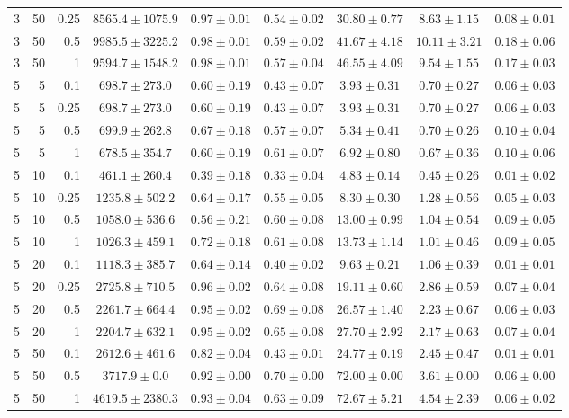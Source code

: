 \begin{table}[htbp]
\begin{tabular}{@{}rrrcccccc@{}}
3 & 50 & 0.25 & $8565.4 \pm 1075.9$ & $0.97 \pm 0.01$ & $0.54 \pm 0.02$ & $30.80 \pm 0.77$ & $8.63 \pm 1.15$ & $0.08 \pm 0.01$ \\
3 & 50 & 0.5 & $9985.5 \pm 3225.2$ & $0.98 \pm 0.01$ & $0.59 \pm 0.02$ & $41.67 \pm 4.18$ & $10.11 \pm 3.21$ & $0.18 \pm 0.06$ \\
3 & 50 & 1 & $9594.7 \pm 1548.2$ & $0.98 \pm 0.01$ & $0.57 \pm 0.04$ & $46.55 \pm 4.09$ & $9.54 \pm 1.55$ & $0.17 \pm 0.03$ \\
\midrule
5 & 5 & 0.1 & $698.7 \pm 273.0$ & $0.60 \pm 0.19$ & $0.43 \pm 0.07$ & $3.93 \pm 0.31$ & $0.70 \pm 0.27$ & $0.06 \pm 0.03$ \\
5 & 5 & 0.25 & $698.7 \pm 273.0$ & $0.60 \pm 0.19$ & $0.43 \pm 0.07$ & $3.93 \pm 0.31$ & $0.70 \pm 0.27$ & $0.06 \pm 0.03$ \\
5 & 5 & 0.5 & $699.9 \pm 262.8$ & $0.67 \pm 0.18$ & $0.57 \pm 0.07$ & $5.34 \pm 0.41$ & $0.70 \pm 0.26$ & $0.10 \pm 0.04$ \\
5 & 5 & 1 & $678.5 \pm 354.7$ & $0.60 \pm 0.19$ & $0.61 \pm 0.07$ & $6.92 \pm 0.80$ & $0.67 \pm 0.36$ & $0.10 \pm 0.06$ \\
5 & 10 & 0.1 & $461.1 \pm 260.4$ & $0.39 \pm 0.18$ & $0.33 \pm 0.04$ & $4.83 \pm 0.14$ & $0.45 \pm 0.26$ & $0.01 \pm 0.02$ \\
5 & 10 & 0.25 & $1235.8 \pm 502.2$ & $0.64 \pm 0.17$ & $0.55 \pm 0.05$ & $8.30 \pm 0.30$ & $1.28 \pm 0.56$ & $0.05 \pm 0.03$ \\
5 & 10 & 0.5 & $1058.0 \pm 536.6$ & $0.56 \pm 0.21$ & $0.60 \pm 0.08$ & $13.00 \pm 0.99$ & $1.04 \pm 0.54$ & $0.09 \pm 0.05$ \\
5 & 10 & 1 & $1026.3 \pm 459.1$ & $0.72 \pm 0.18$ & $0.61 \pm 0.08$ & $13.73 \pm 1.14$ & $1.01 \pm 0.46$ & $0.09 \pm 0.05$ \\
5 & 20 & 0.1 & $1118.3 \pm 385.7$ & $0.64 \pm 0.14$ & $0.40 \pm 0.02$ & $9.63 \pm 0.21$ & $1.06 \pm 0.39$ & $0.01 \pm 0.01$ \\
5 & 20 & 0.25 & $2725.8 \pm 710.5$ & $0.96 \pm 0.02$ & $0.64 \pm 0.08$ & $19.11 \pm 0.60$ & $2.86 \pm 0.59$ & $0.07 \pm 0.04$ \\
5 & 20 & 0.5 & $2261.7 \pm 664.4$ & $0.95 \pm 0.02$ & $0.69 \pm 0.08$ & $26.57 \pm 1.40$ & $2.23 \pm 0.67$ & $0.06 \pm 0.03$ \\
5 & 20 & 1 & $2204.7 \pm 632.1$ & $0.95 \pm 0.02$ & $0.65 \pm 0.08$ & $27.70 \pm 2.92$ & $2.17 \pm 0.63$ & $0.07 \pm 0.04$ \\
5 & 50 & 0.1 & $2612.6 \pm 461.6$ & $0.82 \pm 0.04$ & $0.43 \pm 0.01$ & $24.77 \pm 0.19$ & $2.45 \pm 0.47$ & $0.01 \pm 0.01$ \\
5 & 50 & 0.5 & $3717.9 \pm 0.0$ & $0.92 \pm 0.00$ & $0.70 \pm 0.00$ & $72.00 \pm 0.00$ & $3.61 \pm 0.00$ & $0.06 \pm 0.00$ \\
5 & 50 & 1 & $4619.5 \pm 2380.3$ & $0.93 \pm 0.04$ & $0.63 \pm 0.09$ & $72.67 \pm 5.21$ & $4.54 \pm 2.39$ & $0.06 \pm 0.02$ \\
\bottomrule
\end{tabular}
\end{table}
